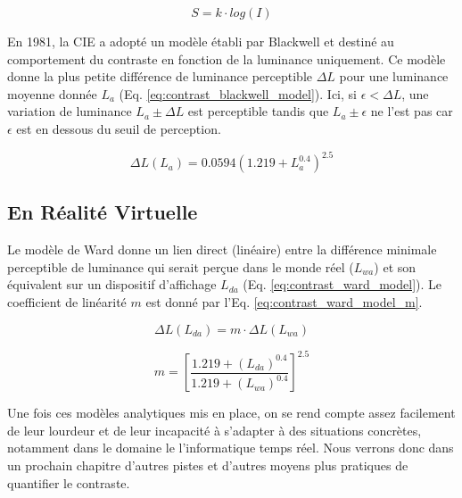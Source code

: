 	\begin{equation}
	S = k \cdot log(I)
	\label{eq:contrast_weber_fechner_law}
	\end{equation}
	
	\par En 1981, la CIE a adopté un modèle établi par Blackwell et destiné au comportement du contraste en fonction de la luminance uniquement. Ce modèle donne la plus petite différence de luminance perceptible $\Delta L$ pour une luminance moyenne donnée $L_{a}$ (Eq. \ref{eq:contrast_blackwell_model}). Ici, si $\epsilon < \Delta L$, une variation de luminance $L_{a} \pm \Delta L$ est perceptible tandis que $L_{a} \pm \epsilon$ ne l'est pas car $\epsilon$ est en dessous du seuil de perception.
	
	\begin{equation}
	\Delta L(L_{a}) = 0.0594 (1.219 + L_{a}^{0.4})^{2.5}
	\label{eq:contrast_blackwell_model}
	\end{equation}
	
	\subsection{En Réalité Virtuelle}
	\par Le modèle de Ward donne un lien direct (linéaire) entre la différence minimale perceptible de luminance qui serait perçue dans le monde réel ($L_{wa}$) et son équivalent sur un dispositif d'affichage $L_{da}$ (Eq. \ref{eq:contrast_ward_model}). Le coefficient de linéarité $m$ est donné par l'Eq. \ref{eq:contrast_ward_model_m}.
	
	\begin{equation}
	\Delta L(L_{da}) = m \cdot \Delta L(L_{wa})
	\label{eq:contrast_ward_model}
	\end{equation}
	
	\begin{equation}
	m = {\left[ \frac{1.219 + (L_{da})^{0.4}}{1.219 + (L_{wa})^{0.4}} \right]}^{2.5}
	\label{eq:contrast_ward_model_m}
	\end{equation}
	
	\par Une fois ces modèles analytiques mis en place, on se rend compte assez facilement de leur lourdeur et de leur incapacité à s'adapter à des situations concrètes, notamment dans le domaine le l'informatique temps réel. Nous verrons donc dans un prochain chapitre d'autres pistes et d'autres moyens plus pratiques de quantifier le contraste.
	
